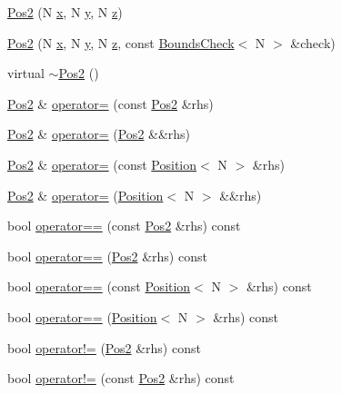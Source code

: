 \begin{DoxyCompactItemize}
\item 
\hyperlink{struct_pos2_ad54b348d074c145a7d6abba6d571846b}{Pos2} (N \hyperlink{struct_position_af908be922fc88d89d81be7d08d06f761}{x}, N \hyperlink{struct_position_af434f54a0aad8bbfc3806ebdd197aa3b}{y}, N \hyperlink{struct_position_ac430da98504c2d4fd685c0363d728474}{z})
\item 
\hyperlink{struct_pos2_af46209c7d52909c4525d49554f000668}{Pos2} (N \hyperlink{struct_position_af908be922fc88d89d81be7d08d06f761}{x}, N \hyperlink{struct_position_af434f54a0aad8bbfc3806ebdd197aa3b}{y}, N \hyperlink{struct_position_ac430da98504c2d4fd685c0363d728474}{z}, const \hyperlink{struct_bounds_check}{Bounds\-Check}$<$ N $>$ \&check)
\item 
virtual \hyperlink{struct_pos2_a638367184a0bc381cd15155e375e5e92}{$\sim$\-Pos2} ()
\item 
\hyperlink{struct_pos2}{Pos2} \& \hyperlink{struct_pos2_a38a5bcfaf5dba1e92cc9d7889daa1721}{operator=} (const \hyperlink{struct_pos2}{Pos2} \&rhs)
\item 
\hyperlink{struct_pos2}{Pos2} \& \hyperlink{struct_pos2_ad2be6bde52c8afa3897beadb2608e3a4}{operator=} (\hyperlink{struct_pos2}{Pos2} \&\&rhs)
\item 
\hyperlink{struct_pos2}{Pos2} \& \hyperlink{struct_pos2_a340228a5c2933605e488596eed7fdc16}{operator=} (const \hyperlink{struct_position}{Position}$<$ N $>$ \&rhs)
\item 
\hyperlink{struct_pos2}{Pos2} \& \hyperlink{struct_pos2_a02609d7ec3de3cb29b237ae280cd4d03}{operator=} (\hyperlink{struct_position}{Position}$<$ N $>$ \&\&rhs)
\item 
bool \hyperlink{struct_pos2_ae8efa7bdafbf75b2a9e689df1f345a44}{operator==} (const \hyperlink{struct_pos2}{Pos2} \&rhs) const 
\item 
bool \hyperlink{struct_pos2_aa255eeb0bcc2c92bc7aeb7a6babb7f71}{operator==} (\hyperlink{struct_pos2}{Pos2} \&rhs) const 
\item 
bool \hyperlink{struct_pos2_aaa70e9e703ecf5cf3c85ab7e262ad2cb}{operator==} (const \hyperlink{struct_position}{Position}$<$ N $>$ \&rhs) const 
\item 
bool \hyperlink{struct_pos2_ad79c54f096426bf141a40af32e88d7d3}{operator==} (\hyperlink{struct_position}{Position}$<$ N $>$ \&rhs) const 
\item 
bool \hyperlink{struct_pos2_a1470c730d1dd5195aa301f81cb9f0a07}{operator!=} (\hyperlink{struct_pos2}{Pos2} \&rhs) const 
\item 
bool \hyperlink{struct_pos2_a03fd764f516526f65ad6faa6e2e9da52}{operator!=} (const \hyperlink{struct_pos2}{Pos2} \&rhs) const 

\end{DoxyCompactItemize}
